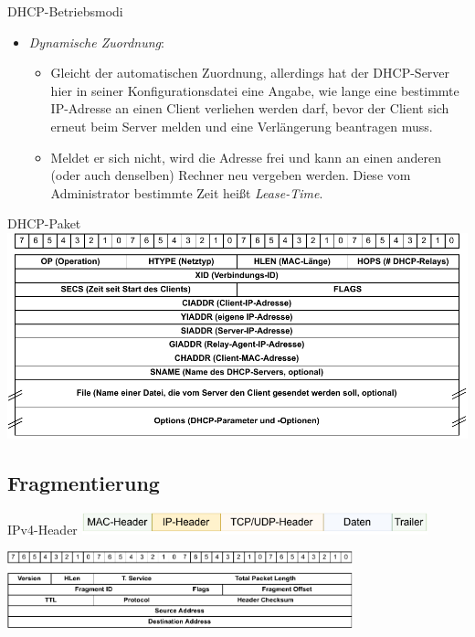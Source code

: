 \begin{defi}{DHCP-Betriebsmodi}
\begin{itemize}
\begin{itemize}
              \end{itemize}
        \item \emph{Dynamische Zuordnung}:
              \begin{itemize}
                  \item Gleicht der automatischen Zuordnung, allerdings hat der DHCP-Server hier in seiner Konfigurationsdatei eine Angabe, wie lange eine bestimmte IP-Adresse an einen Client verliehen werden darf, bevor der Client sich erneut beim Server melden und eine Verlängerung beantragen muss.
                  \item Meldet er sich nicht, wird die Adresse frei und kann an einen anderen (oder auch denselben) Rechner neu vergeben werden. Diese vom Administrator bestimmte Zeit heißt \emph{Lease-Time}.
              \end{itemize}
    \end{itemize}
\end{defi}

\begin{bonus}{DHCP-Paket}
    \centering
    \includegraphics[width=.75\textwidth]{includes/figures/defi_dhcp_paket.pdf}
\end{bonus}

\subsection{Fragmentierung}

\begin{defi}{IPv4-Header}
    \centering
    \includegraphics[width=0.75\textwidth]{includes/figures/defi_ip_header_kapselung.pdf}

    \includegraphics[width=0.75\textwidth]{includes/figures/defi_ip_header.pdf}
\end{defi}

